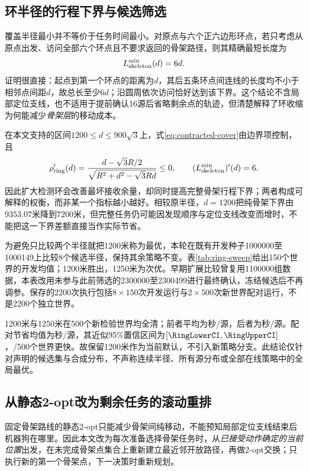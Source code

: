 \subsection{环半径的行程下界与候选筛选}
\label{sec:ring-sweep}
覆盖半径最小并不等价于任务时间最小。对原点与六个正六边形环点，若只考虑从原点出发、访问全部六个环点且不要求返回的骨架路径，则其精确最短长度为
\begin{equation}\label{eq:ring-tour}
L_{\rm skeleton}^{\min}(d)=6d.
\end{equation}
证明很直接：起点到第一个环点的距离为$d$，其后五条环点间连线的长度均不小于相邻点间距$d$，故总长至少$6d$；沿圆周依次访问恰好达到该下界。这个结论不含局部定位支线，也不适用于提前确认16源后省略剩余点的轨迹，但清楚解释了环收缩为何能减少\emph{骨架层}的移动成本。

在本文支持的区间$1200\le d\le900\sqrt3$上，式\eqref{eq:contracted-cover}由边界项控制，且
\[
\rho_{\rm ring}'(d)=\frac{d-\sqrt3R/2}{\sqrt{R^2+d^2-\sqrt3Rd}}\le0,
\qquad (L_{\rm skeleton}^{\min})'(d)=6.
\]
因此扩大检测环会改善最坏接收余量，却同时提高完整骨架行程下界；两者构成可解释的权衡，而非某一个指标越小越好。相较原半径，$d=1200$把纯骨架下界由$9353.07$米降到$7200$米，但完整任务仍可能因发现顺序与定位支线改变而增时，不能把这一下界差额直接当作实际节省。

为避免只比较两个半径就把1200米称为最优，本轮在既有开发种子1000000至1000149上比较8个候选半径，保持其余策略不变。表\ref{tab:ring-sweep}给出150个世界的开发均值；1200米胜出，1250米为次优。早期扩展比较曾复用1100000组数据，本表改用未参与此前筛选的2300000至2300499进行最终确认，冻结候选后不再调参。保存的2200次执行包括$8\times150$次开发运行与$2\times500$次新世界配对运行，不是2200个独立世界。
\begin{table}[H]\centering\small
\caption{Q3安全环半径筛选；时间单位为秒/源，破折号表示未进入样本外复核}\label{tab:ring-sweep}

\end{table}
1200米与1250米在500个新检验世界均全清；前者平均为\RingSelectedTime{}秒/源，后者为\RingControlTime{}秒/源。配对节省均值为\RingSaving{}秒/源，其近似95\%置信区间为$[\RingLowerCI,\RingUpperCI]$，\RingFaster/500个世界更快。故保留1200米作为当前默认，不引入新策略分支。此结论仅针对声明的候选集与合成分布，不声称连续半径、所有源分布或全部在线策略中的全局最优。

\subsection{从静态2-opt改为剩余任务的滚动重排}
固定骨架路线的静态2-opt只能减少骨架间纯移动，不能预知局部定位支线结束后机器狗在哪里。因此本文改为每次准备选择骨架任务时，从\emph{已接受动作确定的当前位置}出发，在未完成骨架点集合上重新建立最近邻开放路径，再做2-opt交换；只执行新的第一个骨架点，下一决策时重新规划。

